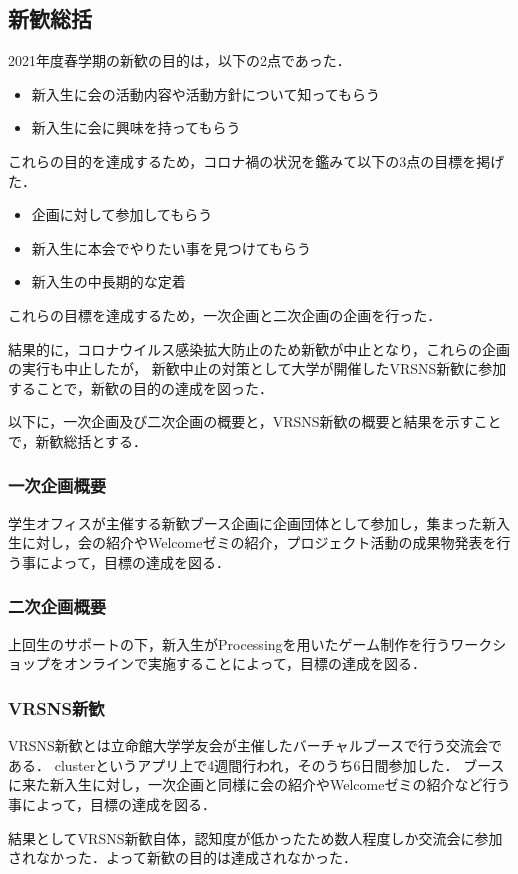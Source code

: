 \subsection*{新歓総括}


2021年度春学期の新歓の目的は，以下の2点であった．

\begin{itemize}
    \item 新入生に会の活動内容や活動方針について知ってもらう
    \item 新入生に会に興味を持ってもらう
\end{itemize}

これらの目的を達成するため，コロナ禍の状況を鑑みて以下の3点の目標を掲げた．

\begin{itemize}
    \item 企画に対して参加してもらう
    \item 新入生に本会でやりたい事を見つけてもらう
    \item 新入生の中長期的な定着
\end{itemize}

これらの目標を達成するため，一次企画と二次企画の企画を行った．

結果的に，コロナウイルス感染拡大防止のため新歓が中止となり，これらの企画の実行も中止したが，
新歓中止の対策として大学が開催したVRSNS新歓に参加することで，新歓の目的の達成を図った．

以下に，一次企画及び二次企画の概要と，VRSNS新歓の概要と結果を示すことで，新歓総括とする．

\subsubsection*{一次企画概要}
学生オフィスが主催する新歓ブース企画に企画団体として参加し，集まった新入生に対し，会の紹介やWelcomeゼミの紹介，プロジェクト活動の成果物発表を行う事によって，目標の達成を図る．

\subsubsection*{二次企画概要}
上回生のサポートの下，新入生がProcessingを用いたゲーム制作を行うワークショップをオンラインで実施することによって，目標の達成を図る．

\subsubsection*{VRSNS新歓}
VRSNS新歓とは立命館大学学友会が主催したバーチャルブースで行う交流会である．
clusterというアプリ上で4週間行われ，そのうち6日間参加した．
ブースに来た新入生に対し，一次企画と同様に会の紹介やWelcomeゼミの紹介など行う事によって，目標の達成を図る．


結果としてVRSNS新歓自体，認知度が低かったため数人程度しか交流会に参加されなかった．よって新歓の目的は達成されなかった．
